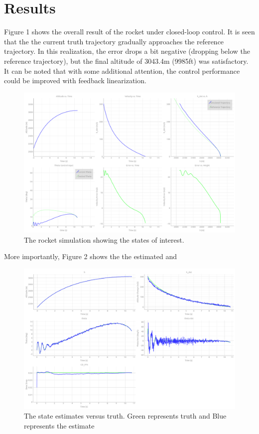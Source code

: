 \documentclass{article}
\begin{document}
  \section{Results}
  Figure 1 shows the overall result of the rocket under closed-loop control. It is seen that the the current truth trajectory gradually approaches the reference trajectory. In this realization, the error drops a bit negative (dropping below the reference trajectory), but the final altitude of 3043.4m (9985ft) was satisfactory. It can be noted that with some additional attention, the control performance could be improved with feedback linearization.

  \begin{figure}
    \includegraphics[width=\linewidth]{figures/main.png}
    \caption{The rocket simulation showing the states of interest.}
    \label{fig:main}
  \end{figure}

  More importantly, Figure 2 shows the the estimated and 

  \begin{figure}
    \includegraphics[width=\linewidth]{figures/estimates.png}
    \caption{The state estimates versus truth. Green represents truth and Blue represents the estimate}
    \label{fig:estimates}
  \end{figure}


\end{document}
